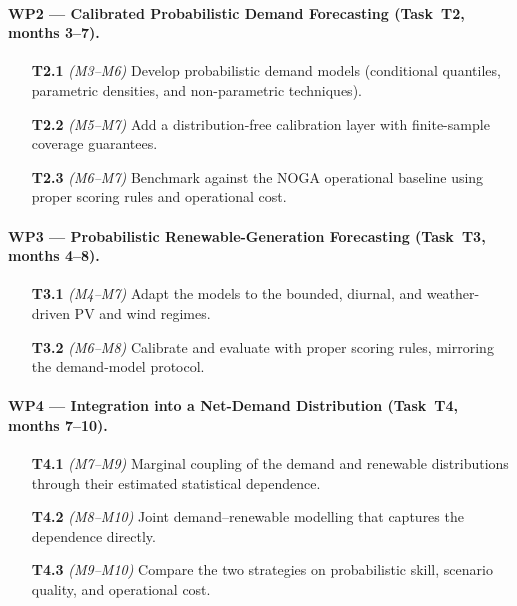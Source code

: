 \documentclass[12pt,a4paper]{article}
\begin{document}
\paragraph{WP2 --- Calibrated Probabilistic Demand Forecasting (Task~T2, months 3--7).}
\begin{itemize}[leftmargin=2.6em,labelsep=0.6em]
    \item[\textbf{T2.1}] \emph{(M3--M6)} Develop probabilistic demand models (conditional
          quantiles, parametric densities, and non-parametric techniques).
    \item[\textbf{T2.2}] \emph{(M5--M7)} Add a distribution-free calibration layer with
          finite-sample coverage guarantees.
    \item[\textbf{T2.3}] \emph{(M6--M7)} Benchmark against the NOGA operational baseline using
          proper scoring rules and operational cost.
\end{itemize}

\paragraph{WP3 --- Probabilistic Renewable-Generation Forecasting (Task~T3, months 4--8).}
\begin{itemize}[leftmargin=2.6em,labelsep=0.6em]
    \item[\textbf{T3.1}] \emph{(M4--M7)} Adapt the models to the bounded, diurnal, and
          weather-driven PV and wind regimes.
    \item[\textbf{T3.2}] \emph{(M6--M8)} Calibrate and evaluate with proper scoring rules,
          mirroring the demand-model protocol.
\end{itemize}

\paragraph{WP4 --- Integration into a Net-Demand Distribution (Task~T4, months 7--10).}
\begin{itemize}[leftmargin=2.6em,labelsep=0.6em]
    \item[\textbf{T4.1}] \emph{(M7--M9)} Marginal coupling of the demand and renewable
          distributions through their estimated statistical dependence.
    \item[\textbf{T4.2}] \emph{(M8--M10)} Joint demand--renewable modelling that captures the
          dependence directly.
    \item[\textbf{T4.3}] \emph{(M9--M10)} Compare the two strategies on probabilistic skill,
          scenario quality, and operational cost.
\end{itemize}
\end{document}
